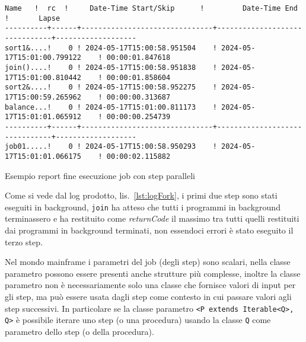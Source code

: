 \begin{elisting}[!htb]
\begin{Verbatim}[fontsize=\small,frame=single]
   Name   !  rc  !     Date-Time Start/Skip      !         Date-Time End         !       Lapse
----------+------+-------------------------------+-------------------------------+-------------------
sort1&....!    0 ! 2024-05-17T15:00:58.951504    ! 2024-05-17T15:01:00.799122    ! 00:00:01.847618
join()....!    0 ! 2024-05-17T15:00:58.951838    ! 2024-05-17T15:01:00.810442    ! 00:00:01.858604
sort2&....!    0 ! 2024-05-17T15:00:58.952275    ! 2024-05-17T15:00:59.265962    ! 00:00:00.313687
balance...!    0 ! 2024-05-17T15:01:00.811173    ! 2024-05-17T15:01:01.065912    ! 00:00:00.254739
----------+------+-------------------------------+-------------------------------+-------------------
job01.....!    0 ! 2024-05-17T15:00:58.950293    ! 2024-05-17T15:01:01.066175    ! 00:00:02.115882
\end{Verbatim}
\caption{Esempio report fine esecuzione job con step paralleli}
\label{lst:logFork}
\end{elisting}
Come si vede dal log prodotto, lis.~\ref{lst:logFork}, i primi due step sono
stati eseguiti in background, \texttt{join} ha atteso che tutti i programmi in
background terminassero e ha restituito come \textit{returnCode} il massimo tra
tutti quelli restituiti dai programmi in background terminati, non essendoci
errori è stato eseguito il terzo step.

Nel mondo mainframe i parametri del job (degli step) sono scalari, nella classe
parametro possono essere presenti anche strutture più complesse, inoltre la
classe parametro non è necessariamente solo una classe che fornisce valori di
input per gli step, ma può essere usata dagli step come contesto in cui passare
valori agli step successivi.
In particolare se la classe parametro \texttt{<P extends Iterable<Q>, Q>} è
possibile iterare uno step (o una procedura) usando la classe \verb!Q! come
parametro dello step (o della procedura).

